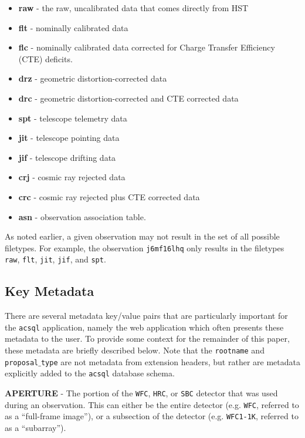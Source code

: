 \documentclass[10pt,journal,compsoc]{IEEEtran}
\begin{document}
\begin{itemize}
  \item \textbf{raw} - the raw, uncalibrated data that comes directly from HST
  \item \textbf{flt} - nominally calibrated data
  \item \textbf{flc} - nominally calibrated data corrected for Charge Transfer Efficiency (CTE) deficits.
  \item \textbf{drz} - geometric distortion-corrected data
  \item \textbf{drc} - geometric distortion-corrected and CTE corrected data
  \item \textbf{spt} - telescope telemetry data
  \item \textbf{jit} - telescope pointing data
  \item \textbf{jif} - telescope drifting data
  \item \textbf{crj} - cosmic ray rejected data
  \item \textbf{crc} - cosmic ray rejected plus CTE corrected data
  \item \textbf{asn} - observation association table.
\end{itemize}

As noted earlier, a given observation may not result in the set of all possible filetypes. For example, the observation \texttt{j6mf16lhq} only results in the
filetypes \texttt{raw}, \texttt{flt}, \texttt{jit}, \texttt{jif}, and \texttt{spt}.


\subsection{Key Metadata} \label{sec1.2}

There are several metadata key/value pairs that are particularly important for the \texttt{acsql} application, namely the web application which often
presents these metadata to the user.  To provide some context for the remainder of this paper, these metadata are briefly described below.  Note that the
\texttt{rootname} and \texttt{proposal$\_$type} are not metadata from extension headers, but rather are metadata explicitly added to the
\texttt{acsql} database schema.\newline

\noindent\textbf{APERTURE} - The portion of the \texttt{WFC}, \texttt{HRC}, or \texttt{SBC} detector that was used during an observation.  This can either be the
entire detector (e.g. \texttt{WFC}, referred to as a ``full-frame image''), or a subsection of the detector (e.g. \texttt{WFC1-1K}, referred to as a ``subarray'').\\
\end{document}

